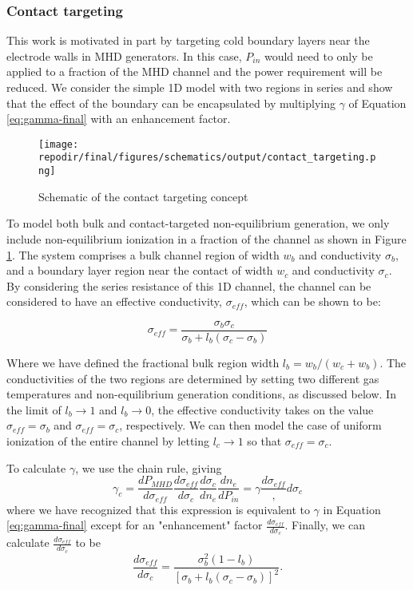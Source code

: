 \subsubsection{Contact targeting}


This work is motivated in part by targeting cold boundary layers near the electrode walls in MHD generators. In this case, $P_{in}$ would need to only be applied to a fraction of the MHD channel and the power requirement will be reduced. We consider the simple 1D model with two regions in series and show that the effect of the boundary can be encapsulated by multiplying $\gamma$ of Equation \ref{eq:gamma-final} with an enhancement factor.

\begin{figure}[h]
    \centering
    \texttt{[image: \\repodir/final/figures/schematics/output/contact\_targeting.png]} 
    \caption{Schematic of the contact targeting concept}
    \label{fig:SI_contact_targeting_schematic}
\end{figure}


To model both bulk and contact-targeted non-equilibrium generation, we only include non-equilibrium ionization in a fraction of the channel as shown in Figure \ref{fig:SI_contact_targeting_schematic}. The system comprises a bulk channel region of width $w_{b}$ and conductivity $\sigma_{b}$, and a boundary layer region near the contact of width $w_{c}$ and conductivity $\sigma_{c}$. By considering the series resistance of this 1D channel, the channel can be considered to have an effective conductivity, $\sigma_{eff}$, which can be shown to be:  

\begin{equation}
\sigma_{eff}=\frac{\sigma_{b} \sigma_{c}}{\sigma_{b}+l_{b}  (\sigma_{c}  -\sigma_{b})}
\end{equation}

Where we have defined the fractional bulk region width $l_{b}=w_{b}/(w_{c}+w_{b})$. The conductivities of the two regions are determined by setting two different gas temperatures and non-equilibrium generation conditions, as discussed below. In the limit of $l_{b}\rightarrow1$ and $l_{b}\rightarrow0$, the effective conductivity takes on the value $\sigma_{eff}= \sigma_{b}$ and $\sigma_{eff}= \sigma_{c}$, respectively. We can then model the case of uniform ionization of the entire channel by letting $l_{c}\rightarrow1$ so that $\sigma_{eff}= \sigma_{c}$.

To calculate $\gamma$, we use the chain rule, giving
\begin{equation}
\gamma_{c}=\frac{dP_{MHD}}{d\sigma_{eff}} \frac{d\sigma_{eff}}{d\sigma_{c}} \frac{d\sigma_{c}}{dn_e} \frac{dn_e}{dP_{in}}=\gamma \frac{d\sigma_{eff}},{d\sigma_{c}} 
\end{equation}
where we have recognized that this expression is equivalent to $\gamma$ in Equation \ref{eq:gamma-final} except for an "enhancement" factor $\frac{d\sigma_{eff}}{d\sigma_{c}}$. Finally, we can calculate $\frac{d\sigma_{eff}}{d\sigma_{c}}$ to be
\begin{equation}
\frac{d\sigma_{eff}}{d\sigma_{c}}=\frac{\sigma_{b}^2 (1-l_{b})}{[\sigma_{b}+l_{b} (\sigma_{c}-\sigma_{b})]^2} .
\end{equation}

